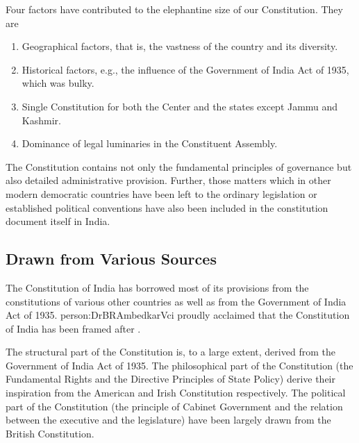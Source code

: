 Four factors have contributed to the elephantine size of our Constitution. They are

\renewcommand{\labelenumi}{\textbf{(\alph{enumi})}}
\begin{enumerate}
  \item Geographical factors, that is, the vastness of the country and its diversity.
  \item Historical factors, e.g., the influence of the Government of India Act of 1935, which was bulky.
  \item Single Constitution for both the Center and the states except Jammu and Kashmir.
  \item Dominance of legal luminaries in the Constituent Assembly.
\end{enumerate}

The Constitution contains not only the fundamental principles of governance but also detailed administrative provision. Further, those matters which in other modern democratic countries have been left to the ordinary legislation or established political conventions have also been included in the constitution document itself in India.

\subsection{Drawn from Various Sources}

The Constitution of India has borrowed most of its provisions from the constitutions of various other countries as well as from the Government of India Act of 1935. \gls{person:DrBRAmbedkarVci} proudly acclaimed that the Constitution of India has been framed after .

The structural part of the Constitution is, to a large extent, derived from the Government of India Act of 1935. The philosophical part of the Constitution (the Fundamental Rights and the Directive Principles of State Policy) derive their inspiration from the American and Irish Constitution respectively. The political part of the Constitution (the principle of Cabinet Government and the relation between the executive and the legislature) have been largely drawn from the British Constitution.

